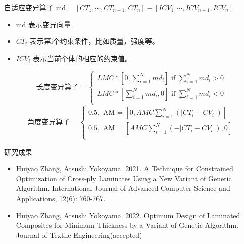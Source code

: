 \documentclass{beamer}
\begin{document}
\begin{frame}{自适应变异算子}
		$\text{md} = [CT_1, \cdots, CT_{n-1}, CT_n] -  [ICV_1, \cdots, ICV_{n-1},
		ICV_n]$ \\
		\begin{itemize}
			\item  md 表示变异向量 
			\item  $CT_i$ 表示第i个约束条件，比如质量，强度等。
			\item  $ICV_i$ 表示当前个体的相应的约束值。
		\end{itemize}

		\begin{equation}
			\text{长度变异算子} =  
			\left\{
				\begin{array}{l}
					  LMC*[0, \sum_{i=1}^{N}{md_i}]  \text{ if $\sum_{i=1}^{N}{md_i} > 0$} \\
					  LMC*[\sum_{i=1}^{N}{md_i}, 0]  \text{ if $\sum_{i=1}^{N}{md_i} < 0$} \\
				  \end{array} 
				  \right.
		\end{equation}
		\begin{equation}
			\text{角度变异算子} = 
				\left\{
					\begin{array}{l}
					0.5, \text{ AM = }[0,AMC \sum_{i=1}^{N}{(|CT_i-CV_i|)}] \\ 
					0.5, \text{ AM = }[ AMC \sum_{i=1}^{N}{(-|CT_i-CV_i|)},0] \\
					\end{array}
					\right.
		\end{equation}
\end{frame}



\begin{frame}{研究成果}
	\begin{center}
		\begin{itemize}
			\item Huiyao Zhang, Atsushi Yokoyama. 2021. A Technique for Constrained Optimization of Cross‑ply Laminates Using a New
				Variant of Genetic Algorithm. International Journal of Advanced Computer Science and Applications, 12(6): 760‑767.
			\item Huiyao Zhang, Atsushi Yokoyama. 2022. Optimum Design of Laminated Composites for Minimum Thickness by a Variant
				of Genetic Algorithm. Journal of Textile Engineering(accepted)
		\end{itemize}
	\end{center}
\end{frame}
\end{document}
